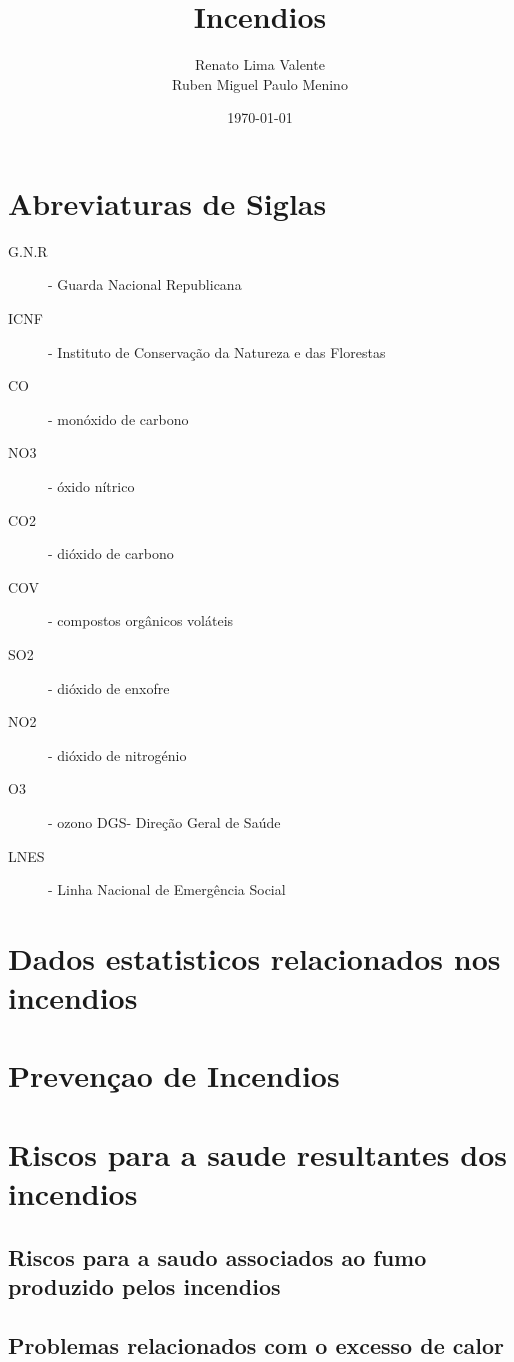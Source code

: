 \documentclass[a4paper,11pt,onecloumn,oneside]{article}
\title{Incendios}
\author{Renato Lima Valente \\Ruben Miguel Paulo Menino}
\date{\today}
\begin{document}
\maketitle

\part{Abreviaturas de Siglas}

\begin{description}
 \item [G.N.R]- Guarda Nacional Republicana
 \item [ICNF] - Instituto de Conservação da Natureza e das Florestas
 \item [CO] - monóxido de carbono
 \item [NO3] - óxido nítrico
 \item [CO2] - dióxido de carbono
 \item [COV] - compostos orgânicos voláteis
 \item [SO2] - dióxido de enxofre
 \item [NO2] - dióxido de nitrogénio
 \item [O3] - ozono DGS- Direção Geral de Saúde
 \item [LNES] - Linha Nacional de Emergência Social
\end{description}


\part{Dados estatisticos relacionados nos incendios}

\part{Prevençao de Incendios}

\part{Riscos para a saude resultantes dos incendios}

\chapter{Riscos para a saudo associados ao fumo produzido pelos incendios}
\chapter{Problemas relacionados com o excesso de calor}
\end{document}
